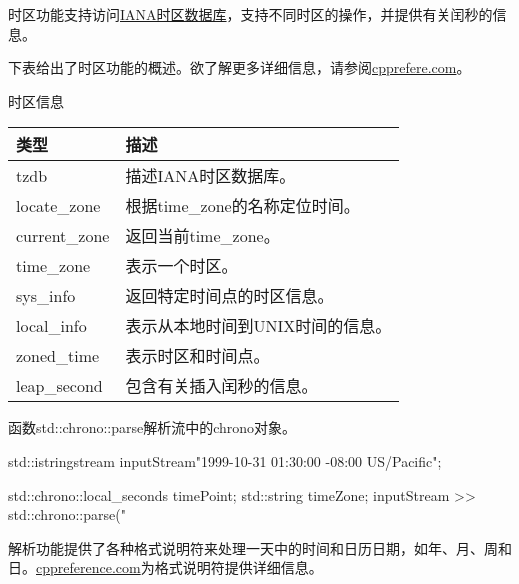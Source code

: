 时区功能支持访问\href{https://www.iana.org/time-zones}{IANA时区数据库}，支持不同时区的操作，并提供有关闰秒的信息。

下表给出了时区功能的概述。欲了解更多详细信息，请参阅\href{https://en.cppreference.com/w/cpp/chrono}{cpprefere.com}。

\begin{center}
时区信息
\end{center}

\begin{longtable}[c]{|l|l|}
\hline
\textbf{类型} & \textbf{描述}                     \\ \hline
\endfirsthead
%
\endhead
%
tzdb          & 描述IANA时区数据库。   \\ \hline
locate\_zone  & 根据time\_zone的名称定位时间。  \\ \hline
current\_zone & 返回当前time\_zone。          \\ \hline
time\_zone    & 表示一个时区。                  \\ \hline
sys\_info    & 返回特定时间点的时区信息。       \\ \hline
local\_info  & 表示从本地时间到UNIX时间的信息。 \\ \hline
zoned\_time   & 表示时区和时间点。 \\ \hline
leap\_second & 包含有关插入闰秒的信息。                   \\ \hline
\end{longtable}


函数std::chrono::parse解析流中的chrono对象。


\begin{cpp}
std::istringstream inputStream{"1999-10-31 01:30:00 -08:00 US/Pacific"};

std::chrono::local_seconds timePoint;
std::string timeZone;
inputStream >> std::chrono::parse("%
\end{cpp}

解析功能提供了各种格式说明符来处理一天中的时间和日历日期，如年、月、周和日。\href{https://en.cppreference.com/w/cpp/chrono/parse}{cppreference.com}为格式说明符提供详细信息。





















